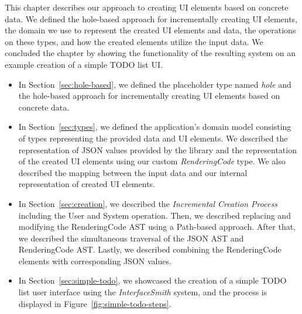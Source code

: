 This chapter describes our approach to creating UI elements based on concrete data.
We defined the hole-based approach for incrementally creating UI elements, the domain we use to represent the created UI elements and data, the operations on these types, and how the created elements utilize the input data.
We concluded the chapter by showing the functionality of the resulting system on an example creation of a simple TODO list UI.

\begin{itemize}
	\item In Section~\ref{sec:hole-based}, we defined the placeholder type named \emph{hole} and the hole-based approach for incrementally creating UI elements based on concrete data.
	\item In Section~\ref{sec:types}, we defined the application's domain model consisting of types representing the provided data and UI elements.
	      We described the representation of JSON values provided by the \citet{simpleJson} library and the representation of the created UI elements using our custom \emph{RenderingCode} type.
	      We also described the mapping between the input data and our internal representation of created UI elements.

	\item In Section~\ref{sec:creation}, we described the \emph{Incremental Creation Process} including the User and System operation.
	      Then, we described replacing and modifying the RenderingCode AST using a Path-based approach.
	      After that, we described the simultaneous traversal of the JSON AST and RenderingCode AST.
	      Lastly, we described combining the RenderingCode elements with corresponding JSON values.
	\item In Section~\ref{sec:simple-todo}, we showcased the creation of a simple TODO list user interface using the \emph{InterfaceSmith} system, and the process is displayed in Figure~\ref{fig:simple-todo-steps}.
\end{itemize}
